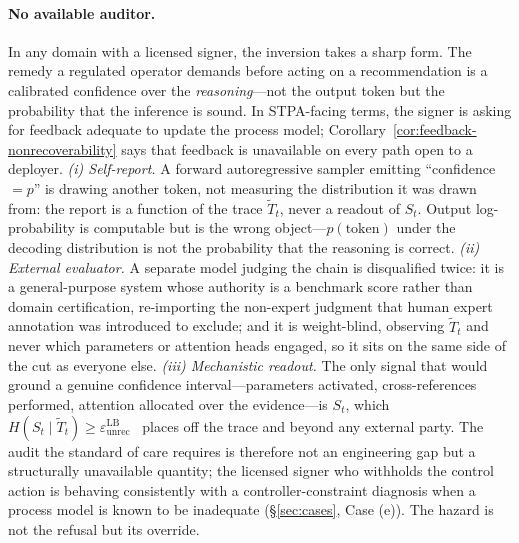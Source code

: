 \paragraph{No available auditor.} In any domain with a licensed signer, the inversion takes a sharp form. The remedy a regulated operator demands before acting on a recommendation is a calibrated confidence over the \emph{reasoning}---not the output token but the probability that the inference is sound. In STPA-facing terms, the signer is asking for feedback adequate to update the process model; Corollary~\ref{cor:feedback-nonrecoverability} says that feedback is unavailable on every path open to a deployer. \emph{(i) Self-report.} A forward autoregressive sampler emitting ``confidence $=p$'' is drawing another token, not measuring the distribution it was drawn from: the report is a function of the trace $\tilde T_t$, never a readout of $S_t$. Output log-probability is computable but is the wrong object---$p(\text{token})$ under the decoding distribution is not the probability that the reasoning is correct. \emph{(ii) External evaluator.} A separate model judging the chain is disqualified twice: it is a general-purpose system whose authority is a benchmark score rather than domain certification, re-importing the non-expert judgment that human expert annotation was introduced to exclude; and it is weight-blind, observing $\tilde T_t$ and never which parameters or attention heads engaged, so it sits on the same side of the cut as everyone else. \emph{(iii) Mechanistic readout.} The only signal that would ground a genuine confidence interval---parameters activated, cross-references performed, attention allocated over the evidence---is $S_t$, which $H(S_t\mid\tilde T_t)\ge\varepsilon_{\mathrm{unrec}}^{\mathrm{LB}}$~\cite{anon2026dual} places off the trace and beyond any external party. The audit the standard of care requires is therefore not an engineering gap but a structurally unavailable quantity; the licensed signer who withholds the control action is behaving consistently with a controller-constraint diagnosis when a process model is known to be inadequate (\S\ref{sec:cases}, Case (e)). The hazard is not the refusal but its override.

